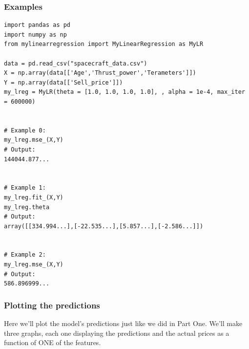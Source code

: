 \documentclass{42-en}
\begin{document}

\subsubsection*{Examples}
\begin{verbatim}
import pandas as pd
import numpy as np
from mylinearregression import MyLinearRegression as MyLR

data = pd.read_csv("spacecraft_data.csv")
X = np.array(data[['Age','Thrust_power','Terameters']])
Y = np.array(data[['Sell_price']])
my_lreg = MyLR(theta = [1.0, 1.0, 1.0, 1.0], , alpha = 1e-4, max_iter = 600000)


# Example 0:
my_lreg.mse_(X,Y)
# Output:
144044.877...


# Example 1:
my_lreg.fit_(X,Y)
my_lreg.theta
# Output:
array([[334.994...],[-22.535...],[5.857...],[-2.586...]])


# Example 2:
my_lreg.mse_(X,Y)
# Output:
586.896999...
\end{verbatim}

\subsubsection*{Plotting the predictions}
Here we'll plot the model's predictions just like we did in Part One.
We'll make three graphs, each one displaying the predictions and the actual prices as a function of ONE of the features.
\end{document}
